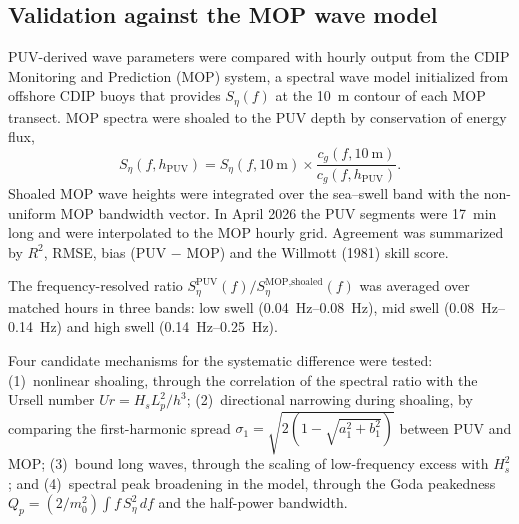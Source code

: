 
\subsection{Validation against the MOP wave model}


PUV-derived wave parameters were compared with hourly output from the CDIP
Monitoring and Prediction (MOP) system, a spectral wave model initialized from
offshore CDIP buoys that provides $S_\eta(f)$ at the \SI{10}{\meter} contour of
each MOP transect. MOP spectra were shoaled to the PUV depth by conservation of
energy flux,
%
\begin{equation}
  S_\eta(f, h_\text{PUV}) = S_\eta(f, \SI{10}{\meter}) \times
  \frac{c_g(f, \SI{10}{\meter})}{c_g(f, h_\text{PUV})} .
\end{equation}
%
Shoaled MOP wave heights were integrated over the sea--swell band with the
non-uniform MOP bandwidth vector. In April 2026 the PUV segments were
\SI{17}{\minute} long and were interpolated to the MOP hourly grid. Agreement was
summarized by $R^2$, RMSE, bias (PUV $-$ MOP) and the Willmott (1981) skill
score.

The frequency-resolved ratio
$S_\eta^\text{PUV}(f) / S_\eta^\text{MOP,shoaled}(f)$ was averaged over matched
hours in three bands: low swell (\SIrange{0.04}{0.08}{\hertz}), mid swell
(\SIrange{0.08}{0.14}{\hertz}) and high swell (\SIrange{0.14}{0.25}{\hertz}).

Four candidate mechanisms for the systematic difference were tested:
(1)~nonlinear shoaling, through the correlation of the spectral ratio with the
Ursell number $\mathit{Ur} = H_s L_p^2 / h^3$; (2)~directional narrowing during
shoaling, by comparing the first-harmonic spread
$\sigma_1 = \sqrt{2(1 - \sqrt{a_1^2 + b_1^2})}$ between PUV and MOP; (3)~bound
long waves, through the scaling of low-frequency excess with $H_s^2$; and
(4)~spectral peak broadening in the model, through the Goda peakedness
$Q_p = (2/m_0^2) \int f\, S_\eta^2\, df$ and the half-power bandwidth.

